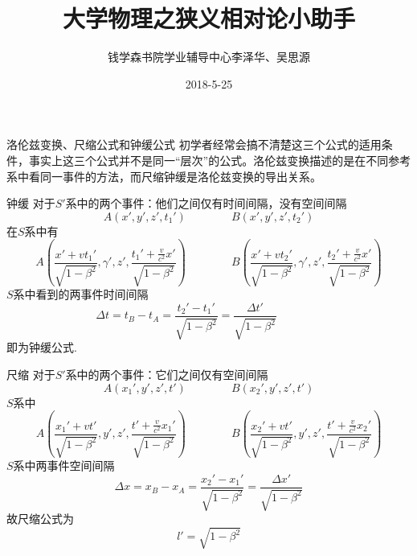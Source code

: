 \documentclass[a4paper,titlepage,onecolmn]{ctexart}
\title{大学物理之狭义相对论小助手}
\author{钱学森书院学业辅导中心李泽华、吴思源}
\date{2018-5-25}
\begin{document}
\maketitle
\begin{section}{洛伦兹变换、尺缩公式和钟缓公式}
初学者经常会搞不清楚这三个公式的适用条件，事实上这三个公式并不是同一“层次”的公式。洛伦兹变换描述的是在不同参考系中看同一事件的方法，而尺缩钟缓是洛伦兹变换的导出关系。

\begin{subsection}{钟缓}
对于$S'$系中的两个事件：他们之间仅有时间间隔，没有空间间隔
\begin{equation*}
A(x',y',z',t_1') \hspace{4em} B(x',y',z',t_2')
\end{equation*}
在$S$系中有
\begin{equation*}
A(\frac{x'+vt_1'}{\sqrt{1-\beta^2}},\gamma',z',\frac{t_1'+\frac{v}{c^2}x'}{\sqrt{1-\beta^2}}) \hspace{4em} 
B(\frac{x'+vt_2'}{\sqrt{1-\beta^2}},\gamma',z',\frac{t_2'+\frac{v}{c^2}x'}{\sqrt{1-\beta^2}})
\end{equation*}
$S$系中看到的两事件时间间隔
\begin{equation*}
\Delta t = t_B - t_A = \frac{t_2'-t_1'}{\sqrt{1-\beta^2}} = \frac{\Delta t'}{\sqrt{1-\beta^2}} \hspace{4em}
\end{equation*}
即为钟缓公式.
\end{subsection}

\begin{subsection}{尺缩}
对于$S'$系中的两个事件：它们之间仅有空间间隔
\begin{equation*}
A(x_1',y',z',t') \hspace{4em} B(x_2',y',z',t')
\end{equation*}
$S$系中
\begin{equation*}
A(\frac{x_1'+vt'}{\sqrt{1-\beta^2}},y',z',\frac{t'+\frac{v}{c^2}x_1'}{\sqrt{1-\beta^2}}) \hspace{4em}
B(\frac{x_2'+vt'}{\sqrt{1-\beta^2}},y',z',\frac{t'+\frac{v}{c^2}x_2'}{\sqrt{1-\beta^2}})
\end{equation*}
$S$系中两事件空间间隔
\begin{equation*}
\Delta x = x_B - x_A = \frac{x_2'-x_1'}{\sqrt{1-\beta^2}} = \frac{\Delta x'}{\sqrt{1-\beta^2}}
\end{equation*}
故尺缩公式为
\begin{equation*}
l'=\sqrt{1-\beta^2}
\end{equation*}
\end{subsection}


\end{section}
\end{document}
